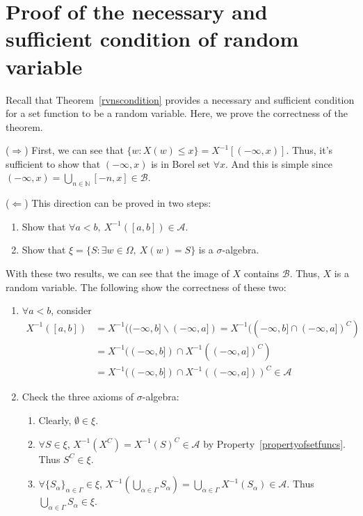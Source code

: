 \documentclass[Probability_Theory.tex]{subfiles}
\begin{document}
\appendix
\section{Proof of the necessary and sufficient condition of random variable}\label{sec:proofrvnscondition}
Recall that Theorem~\ref{rvnscondition} provides a necessary and sufficient condition for a set function to be a random variable. Here, we prove the correctness of the theorem.

($\Rightarrow$) First, we can see that $\{w:X(w)\leq x\} = X^{-1}[(-\infty,x)]$. Thus, it's sufficient to show that $(-\infty,x)$ is in Borel set $\forall x$. And this is simple since $(-\infty,x) = \bigcup_{n\in\mathbb{N}}[-n,x]\in\mathcal{B}$.

($\Leftarrow$) This direction can be proved in two steps:
\begin{enumerate}
	\item Show that $\forall a<b,\ X^{-1}([a,b])\in\mathcal{A}$.
	\item Show that $\xi = \{S:\exists w\in\Omega,\ X(w)=S \}$ is a $\sigma$-algebra.
\end{enumerate}
With these two results, we can see that the image of $X$ contains $\mathcal{B}$. Thus, $X$ is a random variable. The following show the correctness of these two:
\begin{enumerate}
	\item $\forall a<b$, consider
	\begin{align*}
	X^{-1}([a,b]) &= X^{-1}((-\infty,b]\backslash(-\infty,a]) = X^{-1}((-\infty,b]\cap(-\infty,a])^C)\\
	&= X^{-1}((-\infty,b]) \cap X^{-1}((-\infty,a])^C)\\
	&=  X^{-1}((-\infty,b]) \cap X^{-1}((-\infty,a]))^C\in\mathcal{A}
	\end{align*}
	\item Check the three axioms of $\sigma$-algebra:
	\begin{enumerate}
		\item Clearly, $\emptyset\in\xi$.
		\item $\forall S\in\xi$, $X^{-1}(X^C) = X^{-1}(S)^C\in\mathcal{A}$ by Property~\ref{propertyofsetfuncs}. Thus $S^C\in\xi$.
		\item $\forall \{S_{\alpha}\}_{\alpha\in\Gamma}\in\xi$, $X^{-1}(\bigcup_{\alpha\in\Gamma}S_{\alpha}) = \bigcup_{\alpha\in\Gamma}X^{-1}(S_{\alpha})\in\mathcal{A}$. Thus $\bigcup_{\alpha\in\Gamma}S_{\alpha}\in\xi$.
	\end{enumerate}
\end{enumerate}
\end{document}
